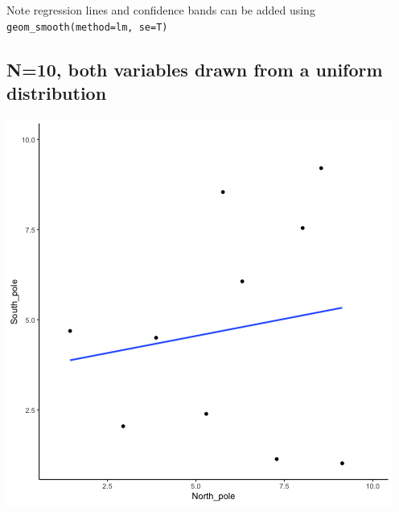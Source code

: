 \documentclass[
]{book}
\begin{document}
Note regression lines and confidence bands can be added using \texttt{geom\_smooth(method=lm,\ se=T)}

\hypertarget{n10-both-variables-drawn-from-a-uniform-distribution}{%
\subsection{N=10, both variables drawn from a uniform distribution}\label{n10-both-variables-drawn-from-a-uniform-distribution}}

\includegraphics{gifs/corUnifn10-1.gif}
\end{document}
